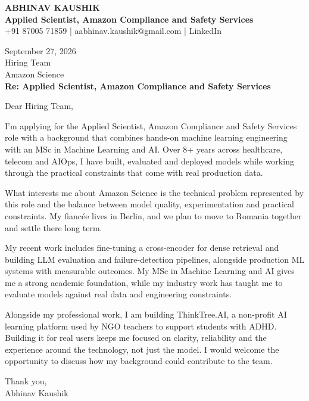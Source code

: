 \documentclass[10pt,a4paper]{article}
\begin{document}
\begin{center}
{\Large\bfseries ABHINAV KAUSHIK}\\[2pt]
{\bfseries Applied Scientist, Amazon Compliance and Safety Services}\\[2pt]
+91 87005 71859 \quad | \quad aabhinav.kaushik@gmail.com \quad | \quad LinkedIn
\end{center}
\vspace{8pt}
September 27, 2026\\[6pt]
Hiring Team\\
Amazon Science\\[4pt]
\textbf{Re: Applied Scientist, Amazon Compliance and Safety Services}

Dear Hiring Team,

I’m applying for the Applied Scientist, Amazon Compliance and Safety Services role with a background that combines hands-on machine learning engineering with an MSc in Machine Learning and AI. Over 8+ years across healthcare, telecom and AIOps, I have built, evaluated and deployed models while working through the practical constraints that come with real production data.

What interests me about Amazon Science is the technical problem represented by this role and the balance between model quality, experimentation and practical constraints. My fiancée lives in Berlin, and we plan to move to Romania together and settle there long term.

My recent work includes fine-tuning a cross-encoder for dense retrieval and building LLM evaluation and failure-detection pipelines, alongside production ML systems with measurable outcomes. My MSc in Machine Learning and AI gives me a strong academic foundation, while my industry work has taught me to evaluate models against real data and engineering constraints.

Alongside my professional work, I am building ThinkTree.AI, a non-profit AI learning platform used by NGO teachers to support students with ADHD. Building it for real users keeps me focused on clarity, reliability and the experience around the technology, not just the model. I would welcome the opportunity to discuss how my background could contribute to the team.

Thank you,\\
Abhinav Kaushik
\end{document}
